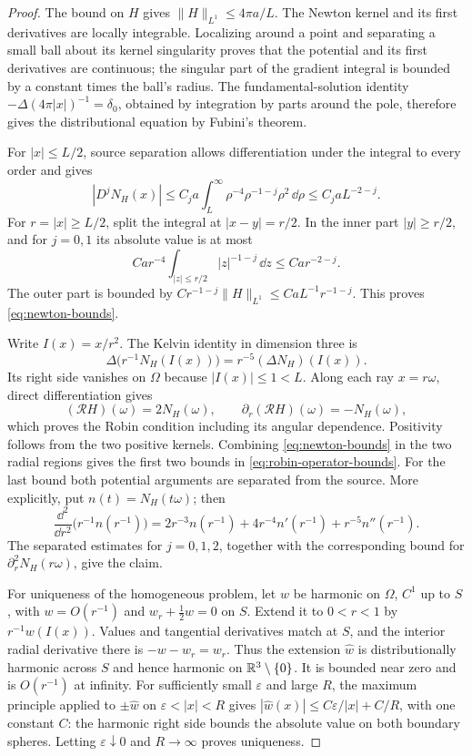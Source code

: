 \begin{proof}
The bound on $H$ gives $\|H\|_{L^1}\le4\pi a/L$.  The Newton kernel
and its first derivatives are locally integrable.  Localizing around a
point and separating a small ball about its kernel singularity proves
that the potential and its first derivatives are continuous; the
singular part of the gradient integral is bounded by a constant times
the ball's radius.  The fundamental-solution identity
$-\Delta(4\pi|x|)^{-1}=\delta_0$, obtained by integration by parts around
the pole, therefore gives the distributional equation by Fubini's
theorem.

For $|x|\le L/2$, source separation allows differentiation under the
integral to every order and gives
\[
 |D^jN_H(x)|\le C_j a\int_L^\infty
          \rho^{-4}\rho^{-1-j}\rho^2\,\dd\rho
       \le C_j aL^{-2-j}.
\]
For $r=|x|\ge L/2$, split the integral at $|x-y|=r/2$.
In the inner part $|y|\ge r/2$, and for $j=0,1$ its absolute value is at
most
\[
 Ca r^{-4}\int_{|z|\le r/2}|z|^{-1-j}\,\dd z
 \le Ca r^{-2-j}.
\]
The outer part is bounded by
$Cr^{-1-j}\|H\|_{L^1}\le CaL^{-1}r^{-1-j}$.
This proves \eqref{eq:newton-bounds}.

Write $I(x)=x/r^2$.  The Kelvin identity in dimension three is
\[
 \Delta\bigl(r^{-1}N_H(I(x))\bigr)
       =r^{-5}(\Delta N_H)(I(x)).
\]
Its right side vanishes on $\Omega$ because $|I(x)|\le1<L$.
Along each ray $x=r\omega$, direct differentiation gives
\[
 (\mathcal RH)(\omega)=2N_H(\omega),\qquad
 \partial_r(\mathcal RH)(\omega)=-N_H(\omega),
\]
which proves the Robin condition including its angular dependence.
Positivity follows from the two positive kernels.  Combining
\eqref{eq:newton-bounds} in the two radial regions gives the first two
bounds in \eqref{eq:robin-operator-bounds}.  For the last bound both
potential arguments are separated from the source.  More explicitly,
put $n(t)=N_H(t\omega)$; then
\[
 \frac{\dd^2}{\dd r^2}\bigl(r^{-1}n(r^{-1})\bigr)
 =2r^{-3}n(r^{-1})+4r^{-4}n'(r^{-1})+r^{-5}n''(r^{-1}).
\]
The separated estimates for $j=0,1,2$, together with the corresponding
bound for $\partial_r^2N_H(r\omega)$, give the claim.

For uniqueness of the homogeneous problem, let $w$ be harmonic on
$\Omega$, $C^1$ up to $S$, with $w=O(r^{-1})$ and
$w_r+\tfrac12w=0$ on $S$.  Extend it to $0<r<1$ by
$r^{-1}w(I(x))$.  Values and tangential derivatives match at $S$, and
the interior radial derivative there is $-w-w_r=w_r$.
Thus the extension $\widehat w$ is distributionally harmonic across $S$
and hence harmonic on $\mathbb R^3\setminus\{0\}$. It is bounded near zero
and is $O(r^{-1})$ at infinity. For sufficiently small $\varepsilon$ and
large $R$, the maximum principle applied to $\pm\widehat w$ on
$\varepsilon<|x|<R$ gives
$|\widehat w(x)|\le C\varepsilon/|x|+C/R$, with one constant $C$:
the harmonic right side bounds the absolute value on both boundary
spheres. Letting $\varepsilon\downarrow0$ and $R\to\infty$ proves
uniqueness.
\end{proof}

